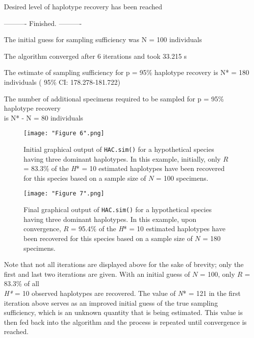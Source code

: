 {\noindent Desired level of haplotype recovery has been reached

\vspace{3mm}

\noindent ---------- Finished. ----------
        
\noindent The initial guess for sampling sufficiency was N = 100 individuals
 
\noindent The algorithm converged after 6 iterations and took 33.215 s 
 
\noindent The estimate of sampling sufficiency for p = 95\% haplotype recovery is N* = 180 \\ individuals ( 95\% CI: 178.278-181.722)
 
\noindent The number of additional specimens required to be sampled for p = 95\% haplotype recovery \\ is N* - N = 80 individuals}

\vspace{2mm}

\begin{figure}[H]

\centering

\texttt{[image: "Figure 6".png]}

\caption{Initial graphical output of {\tt HAC.sim()} for a hypothetical species having three dominant haplotypes. In this example, initially, only $R$ = 83.3\% of the \textit{H}* = 10 estimated haplotypes have been recovered for this species based on a sample size of $N$ = 100 specimens.}

\end{figure}


\begin{figure}[H]

\centering

\texttt{[image: "Figure 7".png]}

\caption{Final graphical output of {\tt HAC.sim()} for a hypothetical species having three dominant haplotypes. In this example, upon convergence, $R$ = 95.4\% of the \textit{H}* = 10 estimated haplotypes have been recovered for this species based on a sample size of $N$ = 180 specimens.}

\end{figure}


\vspace{2mm}

Note that not all iterations are displayed above for the sake of brevity; only the first and last two iterations are given. With an initial guess of $N$ = 100, only $R$ = 83.3\% of all \\ \textit{H*} = 10 observed haplotypes are recovered. The value of \textit{N}* = 121 in the first iteration above serves as an improved initial guess of the true sampling sufficiency, which is an unknown quantity that is being estimated. This value is then fed back into the algorithm and the process is repeated until convergence is reached. 


